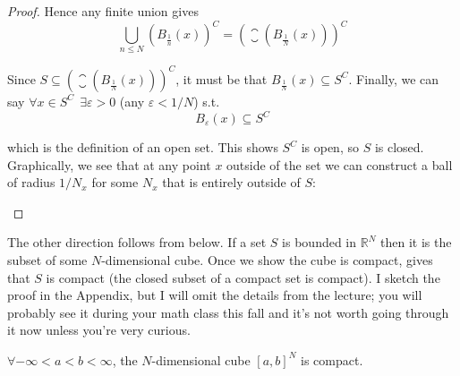 \documentclass{article}
\begin{document}
\begin{proof}
  Hence any finite union gives
  \[
    \bigcup_{n \le N} \left(B_{\frac{1}{n}}(x)\right)^C =  \left(\closure(B_{\frac{1}{N}}(x))\right)^C
  \]

  Since $S \subseteq \left(\closure(B_{\frac{1}{N}}(x))\right)^C$, it must be that $B_{\frac{1}{N}}(x) \subseteq S^C$. Finally, we can say $\forall x \in S^C ~~ \exists \varepsilon > 0$ (any $\varepsilon < 1/N$) s.t.
  \[
    B_\varepsilon(x) \subseteq S^C
  \]

  which is the definition of an open set. This shows $S^C$ is open, so $S$ is closed. Graphically, we see that at any point $x$ outside of the set we can construct a ball of radius $1 / N_x$ for some $N_x$ that is entirely outside of $S$:
  \begin{figure}[H]
    \centering
  \end{figure}
\end{proof}

The other direction follows from  below. If a set $S$ is bounded in $\mathbb{R}^N$ then it is the subset of some $N$-dimensional cube. Once we show the cube is compact,  gives that $S$ is compact (the closed subset of a compact set is compact). I sketch the proof in the Appendix, but I will omit the details from the lecture; you will probably see it during your math class this fall and it's not worth going through it now unless you're very curious.
\begin{theorem}\label{thm:lecture3_compactness_heine_borel_og}
  $\forall -\infty < a < b < \infty$, the $N$-dimensional cube $[a, b]^N$ is compact.
\end{theorem}
\end{document}
